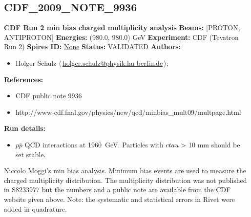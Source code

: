 \clearpage


\clearpage

\subsection{CDF\_2009\_NOTE\_9936}
\textbf{CDF Run 2 min bias charged multiplicity analysis}\newline
\textbf{Beams:} [PROTON, ANTIPROTON] \newline
\textbf{Energies:} (980.0, 980.0) GeV \newline
\textbf{Experiment:} CDF (Tevatron Run 2) \newline
\textbf{Spires ID:} \href{http://www.slac.stanford.edu/spires/find/hep/www?rawcmd=key+None}{None}\newline
\textbf{Status:} VALIDATED\newline
\textbf{Authors:}
\begin{itemize}
  \item Holger Schulz $\langle\,$\href{mailto:holger.schulz@physik.hu-berlin.de}{holger.schulz@physik.hu-berlin.de}$\,\rangle$;
\end{itemize}
\textbf{References:}
\begin{itemize}
  \item CDF public note 9936
  \item http://www-cdf.fnal.gov/physics/new/qcd/minbias_mult09/multpage.html
\end{itemize}
\textbf{Run details:}
\begin{itemize}

  \item $p\bar{p}$ QCD interactions at 1960~GeV. Particles with $c \\tau > {}$10 mm should be set stable.\end{itemize}

\noindent Niccolo Moggi's min bias analysis. Minimum bias events are used to measure the charged multiplicity distribution. The multiplicity distribution was not published in S8233977 but the numbers and a public note are available from the CDF website given above. Note: the systematic and statistical errors in Rivet were added in quadrature.

\clearpage


\clearpage

